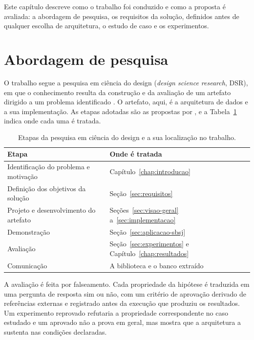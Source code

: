 Este capítulo descreve como o trabalho foi conduzido e como a proposta é avaliada: a abordagem de pesquisa, os requisitos da solução, definidos antes de qualquer escolha de arquitetura, o estudo de caso e os experimentos.

\section{Abordagem de pesquisa}\label{sec:dsr}

O trabalho segue a pesquisa em ciência do design (\textit{design science research}, DSR), em que o conhecimento resulta da construção e da avaliação de um artefato dirigido a um problema identificado \cite{hevner2004}. O artefato, aqui, é a arquitetura de dados e a sua implementação. As etapas adotadas são as propostas por , e a Tabela~\ref{tab:dsr-etapas} indica onde cada uma é tratada.

\begin{table}[htbp]
    \centering
    \caption{Etapas da pesquisa em ciência do design e a sua localização no trabalho.}
    \label{tab:dsr-etapas}
    \begin{tabularx}{\linewidth}{X l}
        \toprule
        Etapa & Onde é tratada \\
        \midrule
        Identificação do problema e motivação & Capítulo~\ref{chap:introducao} \\
        Definição dos objetivos da solução & Seção~\ref{sec:requisitos} \\
        Projeto e desenvolvimento do artefato & Seções~\ref{sec:visao-geral} a~\ref{sec:implementacao} \\
        Demonstração & Seção~\ref{sec:aplicacao-sbsj} \\
        Avaliação & Seção~\ref{sec:experimentos} e Capítulo~\ref{chap:resultados} \\
        Comunicação & A biblioteca e o banco extraído \\
        \bottomrule
    \end{tabularx}
    \par{}
\end{table}

A avaliação é feita por falseamento. Cada propriedade da hipótese é traduzida em uma pergunta de resposta sim ou não, com um critério de aprovação derivado de referências externas e registrado antes da execução que produziu os resultados. Um experimento reprovado refutaria a propriedade correspondente no caso estudado e um aprovado não a prova em geral, mas mostra que a arquitetura a sustenta nas condições declaradas.

